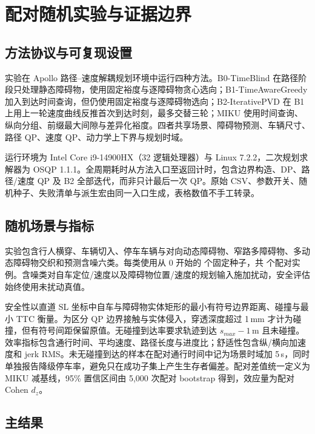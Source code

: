 \section{配对随机实验与证据边界}
\label{sec:experiment}

\subsection{方法协议与可复现设置}

实验在 Apollo 路径--速度解耦规划环境中运行四种方法。B0-TimeBlind 在路径阶段只处理静态障碍物，使用固定裕度与逐障碍物贪心选向；B1-TimeAwareGreedy 加入到达时间查询，但仍使用固定裕度与逐障碍物选向；B2-IterativePVD 在 B1 上用上一轮速度曲线反推首次到达时刻，最多交替三轮；MIKU 使用时间查询、纵向分组、前缀最大间隙与差异化裕度。四者共享场景、障碍物预测、车辆尺寸、路径 QP、速度 QP、动力学上下界与规划时域。

运行环境为 Intel Core i9-14900HX（32 逻辑处理器）与 Linux 7.2.2，二次规划求解器为 OSQP 1.1.1\citep{stellato2020osqp}。全周期耗时从方法入口至返回计时，包含边界构造、DP、路径/速度 QP 及 B2 全部迭代，而非只计最后一次 QP。原始 CSV、参数开关、随机种子、失败清单与派生宏由同一入口生成，表格数值不手工转录。

\subsection{随机场景与指标}

实验包含行人横穿、车辆切入、停车车辆与对向动态障碍物、窄路多障碍物、多动态障碍物交织和预测含噪六类。每类使用从 0 开始的 \RandSeedCount 个固定种子，共 \RandCaseCount 个配对实例。含噪类对自车定位/速度以及障碍物位置/速度的规划输入施加扰动，安全评估始终使用未扰动真值。

安全性以直道 SL 坐标中自车与障碍物实体矩形的最小有符号边界距离、碰撞与最小 TTC 衡量。为区分 QP 边界接触与实体侵入，穿透深度超过 1\,mm 才计为碰撞，但有符号间距保留原值。无碰撞到达率要求轨迹到达 $s_{max}-1$\,m 且未碰撞。效率指标包含通行时间、平均速度、路径长度与进度比；舒适性包含纵/横向加速度和 jerk RMS。未无碰撞到达的样本在配对通行时间中记为场景时域加 5\,s，同时单独报告降级停车率，避免只在成功子集上产生生存者偏差。配对差值统一定义为 MIKU 减基线，95\% 置信区间由 5,000 次配对 bootstrap 得到，效应量为配对 Cohen $d_z$。

\subsection{主结果}

